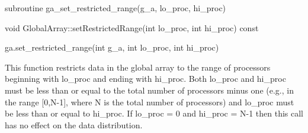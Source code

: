 \documentclass[12pt]{article}
\begin{document}
\begin{fapi}
\begin{fcode}
subroutine ga_set_restricted_range(g_a, lo_proc, hi_proc)
\end{fcode}
\begin{funcargs}
\end{funcargs}
\end{fapi}

\begin{cxxapi}
\begin{cxxcode}
void GlobalArray::setRestrictedRange(int lo_proc, int hi_proc) const
\end{cxxcode}
\begin{funcargs}
\end{funcargs}
\end{cxxapi}

\begin{pyapi}
\begin{pycode}
ga.set_restricted_range(int g_a, int lo_proc, int hi_proc)
\end{pycode}
\begin{funcargs}
\end{funcargs}
\end{pyapi}

\gcoll

\begin{desc}

This function restricts data in the global array to the range of processors
beginning with lo_proc and ending with hi_proc. Both lo_proc and hi_proc must
be less than or equal to the total number of processors minus one (e.g., in the
range [0,N-1], where N is the total number of processors) and lo_proc must be
less than or equal to hi_proc. If lo_proc = 0 and hi_proc = N-1 then this call
has no effect on the data distribution.

\end{desc}


\end{document}
